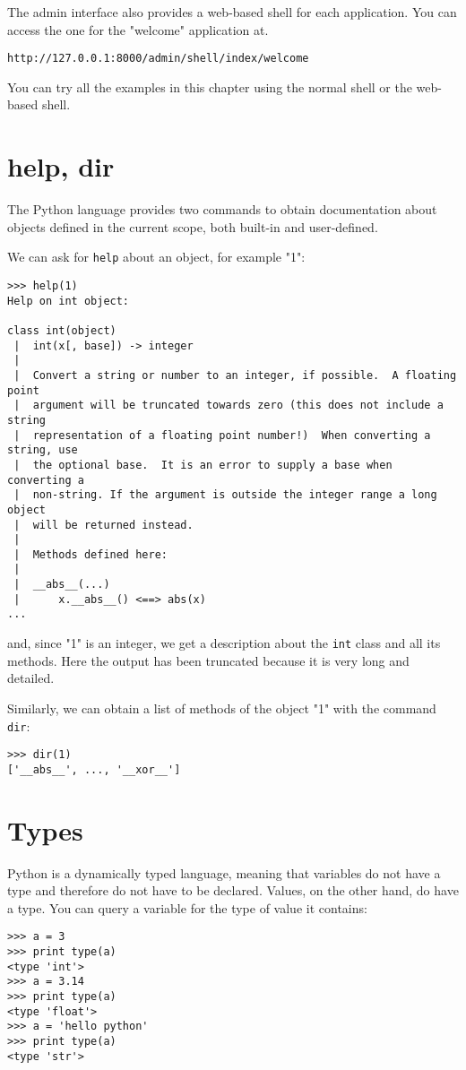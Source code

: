 \documentclass[justified,sixbynine,notoc]{tufte-book}
\def\ft{\small\tt}
\def\inxx#1{\index{#1}}
\begin{document}
\begin{fullwidth}
The admin interface also provides a web-based shell for each application. You can access the one for the "welcome" application at.
\begin{lstlisting}[keywords={}]
http://127.0.0.1:8000/admin/shell/index/welcome
\end{lstlisting}

You can try all the examples in this chapter using the normal shell or the web-based shell.

\goodbreak\section{help, dir}

\inxx{help} \inxx{dir}

The Python language provides two commands to obtain documentation about objects defined in the current scope, both built-in and user-defined.

We can ask for {\ft help} about an object, for example "1":
\begin{lstlisting}
>>> help(1)
Help on int object:

class int(object)
 |  int(x[, base]) -> integer
 |
 |  Convert a string or number to an integer, if possible.  A floating point
 |  argument will be truncated towards zero (this does not include a string
 |  representation of a floating point number!)  When converting a string, use
 |  the optional base.  It is an error to supply a base when converting a
 |  non-string. If the argument is outside the integer range a long object
 |  will be returned instead.
 |
 |  Methods defined here:
 |
 |  __abs__(...)
 |      x.__abs__() <==> abs(x)
...
\end{lstlisting}
\noindent and, since "1" is an integer, we get a description about the {\ft int} class and all its methods. Here the output has been truncated because it is very long and detailed.

Similarly, we can obtain a list of methods of the object "1" with the command {\ft dir}:
\begin{lstlisting}
>>> dir(1)
['__abs__', ..., '__xor__']
\end{lstlisting}

\goodbreak\section{Types}

\inxx{type}
Python is a dynamically typed language, meaning that variables do not have a type and therefore do not have to be declared. Values, on the other hand, do have a type. You can query a variable for the type of value it contains:
\begin{lstlisting}
>>> a = 3
>>> print type(a)
<type 'int'>
>>> a = 3.14
>>> print type(a)
<type 'float'>
>>> a = 'hello python'
>>> print type(a)
<type 'str'>
\end{lstlisting}


\end{fullwidth}
\end{document}
